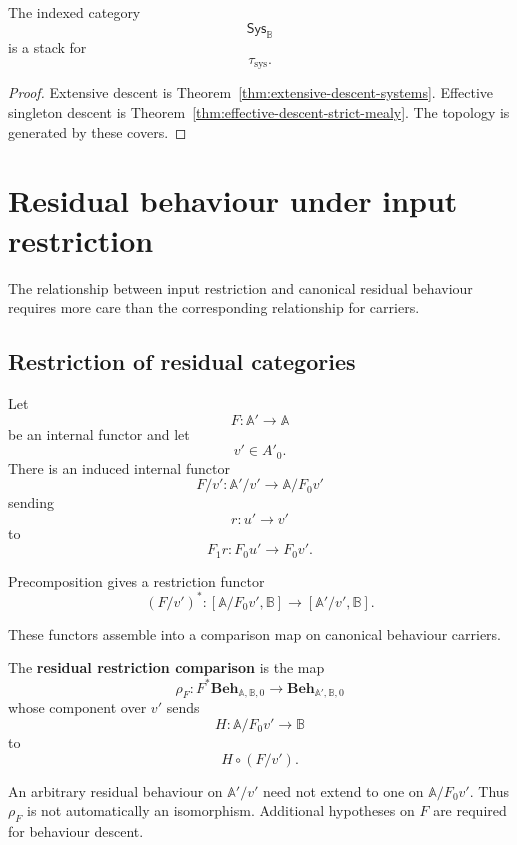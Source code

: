 \begin{corollary}
\label{cor:stack-strict-mealy-systems}
The indexed category
\[
    \mathsf{Sys}_{\mathbb B}
\]
is a stack for
\[
    \tau_{\mathrm{sys}}.
\]
\end{corollary}

\begin{proof}
Extensive descent is
Theorem~\ref{thm:extensive-descent-systems}. Effective singleton descent is
Theorem~\ref{thm:effective-descent-strict-mealy}. The topology is generated by
these covers.
\end{proof}

\section{Residual behaviour under input restriction}
\label{sec:residual-behaviour-input-restriction}

The relationship between input restriction and canonical residual behaviour
requires more care than the corresponding relationship for carriers.

\subsection{Restriction of residual categories}
\label{subsec:restriction-residual-categories}

Let
\[
    F:\mathbb A'\to\mathbb A
\]
be an internal functor and let
\[
    v'\in A'_0.
\]
There is an induced internal functor
\[
    F/v':
    \mathbb A'/v'
    \to
    \mathbb A/F_0v'
\]
sending
\[
    r:u'\to v'
\]
to
\[
    F_1r:F_0u'\to F_0v'.
\]

Precomposition gives a restriction functor
\[
    (F/v')^\ast:
    [\mathbb A/F_0v',\mathbb B]
    \to
    [\mathbb A'/v',\mathbb B].
\]

These functors assemble into a comparison map on canonical behaviour
carriers.

\begin{definition}
\label{def:residual-restriction-comparison}
The \textbf{residual restriction comparison} is the map
\[
    \rho_F:
    F^\ast
    \mathbf{Beh}_{\mathbb A,\mathbb B,0}
    \to
    \mathbf{Beh}_{\mathbb A',\mathbb B,0}
\]
whose component over \(v'\) sends
\[
    H:\mathbb A/F_0v'\to\mathbb B
\]
to
\[
    H\circ(F/v').
\]
\end{definition}

\begin{remark}
\label{rem:residual-restriction-not-surjective}
An arbitrary residual behaviour on \(\mathbb A'/v'\) need not extend to one
on \(\mathbb A/F_0v'\). Thus \(\rho_F\) is not automatically an isomorphism.
Additional hypotheses on \(F\) are required for behaviour descent.
\end{remark}

